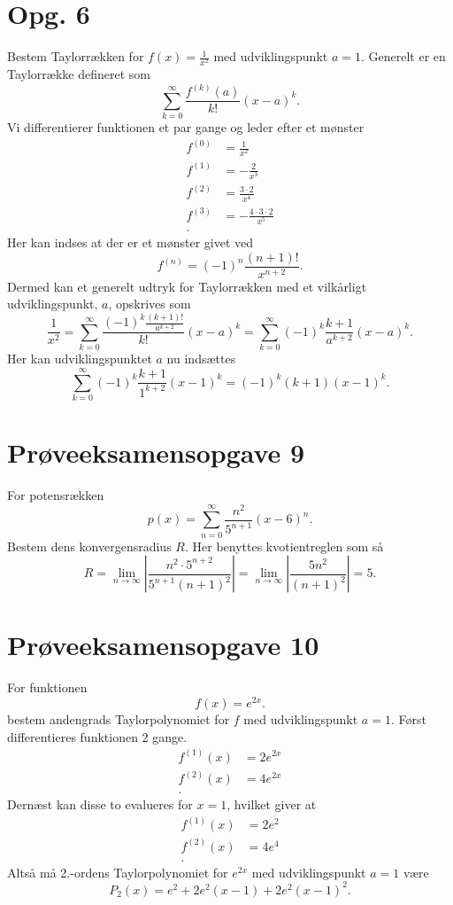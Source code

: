 \documentclass[12pt]{article}
\begin{document}
\section*{Opg. 6}
Bestem Taylorrækken for $f(x)=\frac{1}{x^2}$ med udviklingspunkt $a=1$.
\bigbreak
Generelt er en Taylorrække defineret som
\[
  \sum_{k = 0}^{\infty} \frac{f^{(k)}(a)}{k!} (x-a)^k 
.\] 
Vi differentierer funktionen et par gange og leder efter et mønster
\begin{align*}
f^{(0)} &= \frac{1}{x^2} \\
f^{(1)} &= -\frac{2}{x^3} \\
f^{(2)} &= \frac{3\cdot 2}{x^4} \\
f^{(3)} &= -\frac{4\cdot 3\cdot 2}{x^5} \\
.\end{align*} 
Her kan indses at der er et mønster givet ved
\[
  f^{(n)} = (-1)^{n} \frac{(n+1)!}{x^{n+2}}
.\] 
Dermed kan et generelt udtryk for Taylorrækken med et vilkårligt udviklingspunkt, $a$, opskrives som
 \[
\frac{1}{x^2} = \sum_{k = 0}^{\infty} \frac{(-1)^k \frac{(k+1)!}{a^{k+2}}}{k!} (x-a)^k = \sum_{k = 0}^{\infty} (-1)^k \frac{k+1}{a^{k+2}} (x-a)^k
.\] 
Her kan udviklingspunktet $a$ nu indsættes
 \[
\sum_{k = 0}^{\infty} (-1)^k \frac{k+1}{1^{k+2}} (x-1)^k = (-1)^k(k+1)(x-1)^k
.\] 

\section*{Prøveeksamensopgave 9}
For potensrækken
\[
p(x) = \sum_{n=0}^{\infty} \frac{n^2}{5^{n+1}}(x-6)^n
.\] 
Bestem dens konvergensradius $R$.
\bigbreak
Her benyttes kvotientreglen som så
\[
R = \lim_{n \to \infty} \left| \frac{n^2\cdot 5^{n+2}}{5^{n+1}(n+1)^2} \right| = \lim_{n \to \infty}  \left| \frac{5n^2}{(n+1)^2} \right| = 5 
.\] 

\section*{Prøveeksamensopgave 10}
For funktionen
\[
f(x) = e^{2x}
.\] 
bestem andengrads Taylorpolynomiet for $f$ med udviklingspunkt $a= 1$.
\bigbreak
Først differentieres funktionen 2 gange.
\begin{align*}
  f^{(1)}(x) &= 2e^{2x} \\
  f^{(2)} (x) &= 4e^{2x} \\
.\end{align*} 
Dernæst kan disse to evalueres for $x=1$, hvilket giver at 
\begin{align*}
  f^{(1)}(x) &= 2e^2 \\
  f^{(2)}(x) &= 4e^4 \\
.\end{align*}
Altså må 2.-ordens Taylorpolynomiet for $e^{2x}$ med udviklingspunkt $a=1$ være
\[
P_2(x) = e^2 + 2e^2(x-1) + 2e^2(x-1)^2
.\] 
\end{document}

